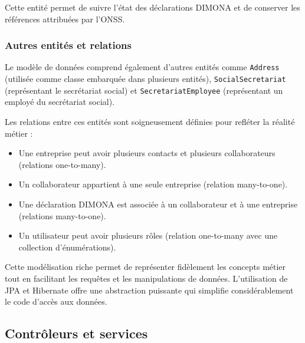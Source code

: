 \vspace{0.5cm}

Cette entité permet de suivre l'état des déclarations DIMONA et de conserver les références attribuées par l'ONSS.

\subsubsection{Autres entités et relations}

Le modèle de données comprend également d'autres entités comme \texttt{Address} (utilisée comme classe embarquée dans plusieurs entités), \texttt{SocialSecretariat} (représentant le secrétariat social) et \texttt{SecretariatEmployee} (représentant un employé du secrétariat social).

\vspace{0.5cm}

\noindent Les relations entre ces entités sont soigneusement définies pour refléter la réalité métier :
\begin{itemize}[leftmargin=*,label=\textcolor{darkgray}{$\bullet$},itemsep=0.3em]
  \item Une entreprise peut avoir plusieurs contacts et plusieurs collaborateurs (relations one-to-many).
  \item Un collaborateur appartient à une seule entreprise (relation many-to-one).
  \item Une déclaration DIMONA est associée à un collaborateur et à une entreprise (relations many-to-one).
  \item Un utilisateur peut avoir plusieurs rôles (relation one-to-many avec une collection d'énumérations).
\end{itemize}

\vspace{0.5cm}

\begin{tcolorbox}[
  title={\textbf{Modélisation des données}},
  colback=blue!5!white,
  colframe=primarycolor,
  fonttitle=\bfseries,
  boxrule=0.5mm,
  arc=2mm,
  left=6mm,
  right=6mm,
  top=6mm,
  bottom=6mm
]
Cette modélisation riche permet de représenter fidèlement les concepts métier tout en facilitant les requêtes et les manipulations de données. L'utilisation de JPA et Hibernate offre une abstraction puissante qui simplifie considérablement le code d'accès aux données.
\end{tcolorbox}

\subsection{Contrôleurs et services}

